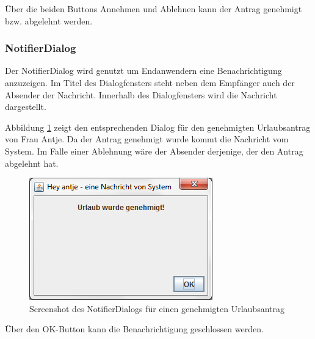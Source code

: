 Über die beiden Buttons Annehmen und Ablehnen kann der Antrag genehmigt bzw. abgelehnt werden.

\subsubsection{NotifierDialog}
Der NotifierDialog wird genutzt um Endanwendern eine Benachrichtigung anzuzeigen. Im Titel des Dialogfensters steht neben dem Empfänger auch der Absender der Nachricht. Innerhalb des Dialogfensters wird die Nachricht dargestellt.

Abbildung \ref{fig:DialogBenachrichtigungGenehmigt} zeigt den entsprechenden Dialog für den genehmigten Urlaubsantrag von Frau Antje. Da der Antrag genehmigt wurde kommt die Nachricht vom System. Im Falle einer Ablehnung wäre der Absender derjenige, der den Antrag abgelehnt hat.

\begin{figure}[H]
\centering
\includegraphics[width=0.5\linewidth]{Bilder/DialogBenachrichtigungGenehmigt}
\caption{Screenshot des NotifierDialogs für einen genehmigten Urlaubsantrag}
\label{fig:DialogBenachrichtigungGenehmigt}
\end{figure}

Über den OK-Button kann die Benachrichtigung geschlossen werden.

